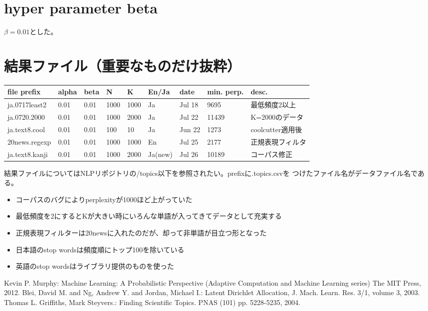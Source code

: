 \documentclass[uplatex,dvipdfmx]{jsarticle}
\begin{document}
\section{hyper parameter beta}
$\beta=0.01$とした。



\protect\newpage
\section{結果ファイル（重要なものだけ抜粋）}
\begin{table}[htb]
\begin{tabular}{||l||l|l|l|l|l|l|l|l||} \hline\hline
file prefix & alpha & beta & N & K & En/Ja & date & min. perp. & desc. \\ \hline\hline 
ja.0717least2 & 0.01 & 0.01 & 1000 & 1000 & Ja & Jul 18 & 9695 & 最低頻度2以上 \\ \hline
ja.0720.2000 & 0.01 & 0.01 & 1000 & 2000 & Ja & Jul 22 & 11439 & K=2000のデータ \\ \hline
ja.text8.cool & 0.01 & 0.01 & 100 & 10 & Ja & Jun 22 & 1273 & coolcutter適用後 \\ \hline
20news.regexp & 0.01 & 0.01 & 1000 & 1000 & En & Jul 25 & 2177 & 正規表現フィルタ \\ \hline
ja.text8.kanji & 0.01 & 0.01 & 1000 & 2000 & Ja(new) & Jul 26 & 10189 & コーパス修正 \\ \hline \hline
\end{tabular}
\end{table}

結果ファイルについてはNLPリポジトリの/topics以下を参照されたい。prefixに.topics.csvを
つけたファイル名がデータファイル名である。

\begin{itemize}
\item コーパスのバグによりperplexityが1000ほど上がっていた
\item 最低頻度を2にするとKが大きい時にいろんな単語が入ってきてデータとして充実する
\item 正規表現フィルターは20newsに入れたのだが、却って非単語が目立つ形となった
\item 日本語のstop wordsは頻度順にトップ100を除いている
\item 英語のstop wordsはライブラリ提供のものを使った
\end{itemize}

\begin{thebibliography}{99}
   Kevin P. Murphy: Machine Learning: A Probabilistic Perspective (Adaptive Computation and Machine Learning series) The MIT Press, 2012.
   Blei, David M. and Ng, Andrew Y. and Jordan, Michael I.: Latent Dirichlet Allocation,
J. Mach. Learn. Res. 3/1, volume 3, 2003.
   Thomas L. Griffiths, Mark Steyvers.: Finding Scientific Topics. PNAS (101) pp. 5228-5235, 2004.
\end{thebibliography}
\end{document}
